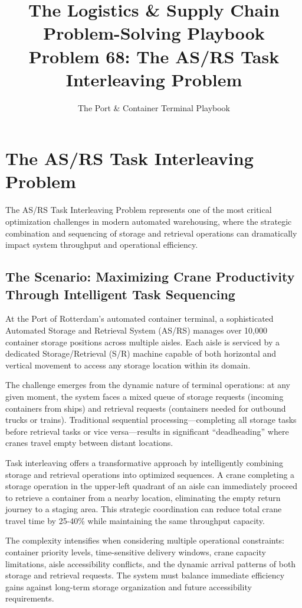 \documentclass{article}
\title{The Logistics \& Supply Chain Problem-Solving Playbook\\Problem 68: The AS/RS Task Interleaving Problem}
\author{The Port \& Container Terminal Playbook}
\date{}
\begin{document}
\maketitle

\section{The AS/RS Task Interleaving Problem}

The AS/RS Task Interleaving Problem represents one of the most critical optimization challenges in modern automated warehousing, where the strategic combination and sequencing of storage and retrieval operations can dramatically impact system throughput and operational efficiency.

\subsection{The Scenario: Maximizing Crane Productivity Through Intelligent Task Sequencing}

At the Port of Rotterdam's automated container terminal, a sophisticated Automated Storage and Retrieval System (AS/RS) manages over 10,000 container storage positions across multiple aisles. Each aisle is serviced by a dedicated Storage/Retrieval (S/R) machine capable of both horizontal and vertical movement to access any storage location within its domain.

The challenge emerges from the dynamic nature of terminal operations: at any given moment, the system faces a mixed queue of storage requests (incoming containers from ships) and retrieval requests (containers needed for outbound trucks or trains). Traditional sequential processing---completing all storage tasks before retrieval tasks or vice versa---results in significant ``deadheading'' where cranes travel empty between distant locations.

Task interleaving offers a transformative approach by intelligently combining storage and retrieval operations into optimized sequences. A crane completing a storage operation in the upper-left quadrant of an aisle can immediately proceed to retrieve a container from a nearby location, eliminating the empty return journey to a staging area. This strategic coordination can reduce total crane travel time by 25-40\% while maintaining the same throughput capacity.

The complexity intensifies when considering multiple operational constraints: container priority levels, time-sensitive delivery windows, crane capacity limitations, aisle accessibility conflicts, and the dynamic arrival patterns of both storage and retrieval requests. The system must balance immediate efficiency gains against long-term storage organization and future accessibility requirements.
\end{document}
